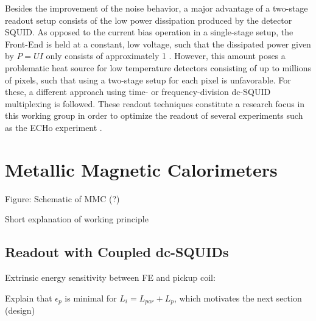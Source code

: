 Besides the improvement of the noise behavior, a major advantage of a two-stage readout setup consists of the low power dissipation produced by the detector SQUID. As opposed to the current bias operation in a single-stage setup, the Front-End is held at a constant, low voltage, such that the dissipated power given by $P=UI$ only consists of approximately \qty{1}{\nW} \cite{Drung2007}. However, this amount poses a problematic heat source for low temperature detectors consisting of up to millions of pixels, such that using a two-stage setup for each pixel is unfavorable. For these, a different approach using time- or frequency-division dc-SQUID multiplexing is followed. These readout techniques constitute a research focus in this working group in order to optimize the readout of several experiments such as the ECHo experiment \cite{Gastaldo2017}.





\section{Metallic Magnetic Calorimeters} \label{sec_MMC}

Figure: Schematic of MMC (?)

Short explanation of working principle


\subsection{Readout with Coupled dc-SQUIDs}

Extrinsic energy sensitivity between FE and pickup coil:





Explain that $ \epsilon_p $ is minimal for $ L_i = L_{par} + L_p $, which motivates the next section (design)

